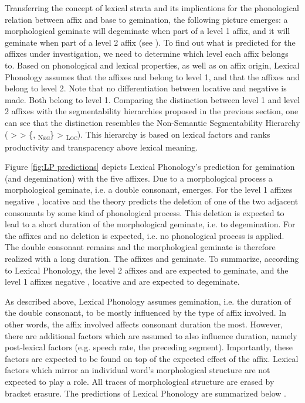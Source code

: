 Transferring the concept of lexical strata and its implications for the phonological relation between affix and base to gemination, the following picture emerges: a morphological geminate will degeminate when part of a level 1 affix, and it will geminate when part of a level 2 affix (see \citealt[18]{Mohanan.1986}). To find out what is predicted for the affixes under investigation, we need to determine which level each affix belongs to. 
Based on phonological and lexical properties, as well as on affix origin, Lexical Phonology assumes that the affixes  and  belong to level 1, and that the affixes  and  belong to level 2. Note that no differentiation between locative and negative  is made. Both belong to level 1.
Comparing the distinction between level 1 and level 2 affixes with the segmentability hierarchies proposed in the previous section, one can see that the distinction resembles the Non-Semantic Segmentability Hierarchy ( >  > \{, \textsubscript{\textsc{Neg}}\} >  \textsubscript{\textsc{Loc}}). This hierarchy is based on lexical factors and ranks productivity and transparency above lexical meaning.  


Figure \ref{fig:LP predictions} depicts Lexical Phonology's prediction for gemination (and degemination) with the five affixes. Due to a morphological process a morphological geminate, i.e. a double consonant, emerges. For the level 1 affixes negative , locative  and  the theory predicts the deletion of one of the two adjacent consonants by some kind of phonological process. This deletion is expected to lead to a short duration of the morphological geminate, i.e. to degemination. For the affixes  and  no deletion is expected, i.e. no phonological process is applied. The double consonant remains and the morphological geminate is therefore realized with a long duration. The affixes  and  geminate.  
To summarize, according to Lexical Phonology, the level 2 affixes  and  are expected to geminate, and the level 1 affixes negative , locative  and  are expected to degeminate. 

As described above, Lexical Phonology assumes gemination, i.e. the duration of the double consonant, to be mostly influenced by the type of affix involved. In other words, the affix involved affects consonant duration the most. However, there are additional factors which are assumed to also influence duration, namely post-lexical factors (e.g. speech rate, the preceding segment). Importantly, these factors are expected to be found on top of the expected effect of the affix. Lexical factors which mirror an individual word's morphological structure are not expected to play a role. All traces of morphological structure are erased by bracket erasure. 
The predictions of Lexical Phonology are summarized below .



